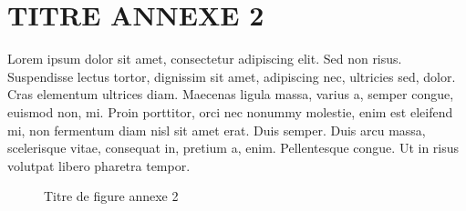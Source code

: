 \section{TITRE ANNEXE 2}
Lorem ipsum dolor sit amet, consectetur adipiscing elit. Sed non risus. Suspendisse lectus tortor, dignissim sit amet, adipiscing nec, ultricies sed, dolor. Cras elementum ultrices diam. Maecenas ligula massa, varius a, semper congue, euismod non, mi. Proin porttitor, orci nec nonummy molestie, enim est eleifend mi, non fermentum diam nisl sit amet erat. Duis semper. Duis arcu massa, scelerisque vitae, consequat in, pretium a, enim. Pellentesque congue. Ut in risus volutpat libero pharetra tempor.\par
\begin{figure}[H]%
    \center%
    \setlength{\fboxsep}{5pt}%
    \setlength{\fboxrule}{0.5pt}%
    \caption{Titre de figure annexe 2}%
\end{figure}
